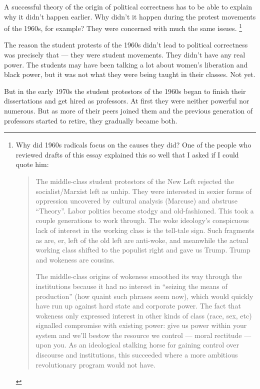 \documentclass[12pt]{book}
\begin{document}
A successful theory of the origin of political correctness has to be
able to explain why it didn't happen earlier. Why didn't it happen
during the protest movements of the 1960s, for example? They were
concerned with much the same issues. \footnote{Why did 1960s radicals focus on the causes they did? One of the
people who reviewed drafts of this essay explained this so well that I
asked if I could quote him:

\begin{quote}
The middle-class student protestors of the New Left rejected the
socialist/Marxist left as unhip. They were interested in sexier forms of
oppression uncovered by cultural analysis (Marcuse) and abstruse
``Theory''. Labor politics became stodgy and old-fashioned. This took a
couple generations to work through. The woke ideology's conspicuous lack
of interest in the working class is the tell-tale sign. Such fragments
as are, er, left of the old left are anti-woke, and meanwhile the actual
working class shifted to the populist right and gave us Trump. Trump and
wokeness are cousins.

The middle-class origins of wokeness smoothed its way through the
institutions because it had no interest in ``seizing the means of
production'' (how quaint such phrases seem now), which would quickly
have run up against hard state and corporate power. The fact that
wokeness only expressed interest in other kinds of class (race, sex,
etc) signalled compromise with existing power: give us power within your
system and we'll bestow the resource we control --- moral rectitude ---
upon you. As an ideological stalking horse for gaining control over
discourse and institutions, this succeeded where a more ambitious
revolutionary program would not have.
\end{quote}}

The reason the student protests of the 1960s didn't lead to political
correctness was precisely that --- they were student movements. They
didn't have any real power. The students may have been talking a lot
about women's liberation and black power, but it was not what they were
being taught in their classes. Not yet.

But in the early 1970s the student protestors of the 1960s began to
finish their dissertations and get hired as professors. At first they
were neither powerful nor numerous. But as more of their peers joined
them and the previous generation of professors started to retire, they
gradually became both.
\end{document}
